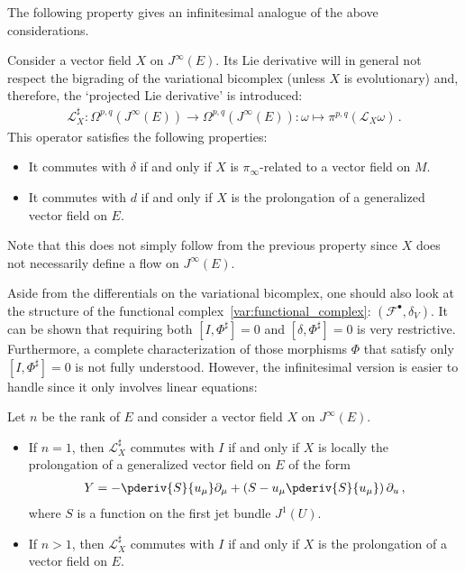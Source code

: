     The following property gives an infinitesimal analogue of the above considerations.
    \begin{property}
        Consider a vector field $X$ on $J^\infty(E)$. Its Lie derivative will in general not respect the bigrading of the variational bicomplex (unless $X$ is evolutionary) and, therefore, the `projected Lie derivative' is introduced:
        \begin{gather}
            \mathcal{L}^\sharp_X:\Omega^{p,q}(J^\infty(E))\rightarrow\Omega^{p,q}(J^\infty(E)):\omega\mapsto\pi^{p,q}(\mathcal{L}_X\omega)\,.
        \end{gather}
        This operator satisfies the following properties:
        \begin{itemize}
            \item It commutes with $\delta$ if and only if $X$ is $\pi_\infty$-related to a vector field on $M$.
            \item It commutes with $d$ if and only if $X$ is the prolongation of a generalized vector field on $E$.
        \end{itemize}
        Note that this does not simply follow from the previous property since $X$ does not necessarily define a flow on $J^\infty(E)$.
    \end{property}

    Aside from the differentials on the variational bicomplex, one should also look at the structure of the functional complex~\eqref{var:functional_complex}: $(\mathcal{F}^\bullet,\delta_V)$. It can be shown that requiring both $[I,\Phi^\sharp]=0$ and $[\delta,\Phi^\sharp]=0$ is very restrictive. Furthermore, a complete characterization of those morphisms $\Phi$ that satisfy only $[I,\Phi^\sharp]=0$ is not fully understood. However, the infinitesimal version is easier to handle since it only involves linear equations:
    \begin{property}
        Let $n$ be the rank of $E$ and consider a vector field $X$ on $J^\infty(E)$.
        \begin{itemize}
            \item If $n=1$, then $\mathcal{L}^\sharp_X$ commutes with $I$ if and only if $X$ is locally the prolongation of a generalized vector field on $E$ of the form
            \begin{gather}
                Y = -\pderiv{S}{u_\mu}\partial_\mu + \left(S - u_\mu\pderiv{S}{u_\mu}\right)\partial_u\,,
            \end{gather}
            where $S$ is a function on the first jet bundle $J^1(U)$.
            \item If $n>1$, then $\mathcal{L}^\sharp_X$ commutes with $I$ if and only if $X$ is the prolongation of a vector field on $E$.
        \end{itemize}
    \end{property}

